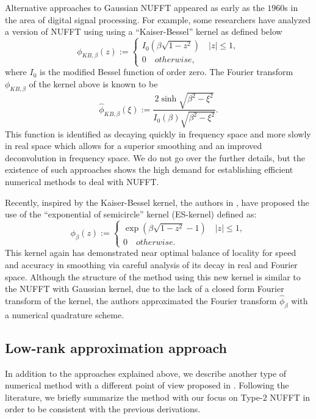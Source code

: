 Alternative approaches to Gaussian NUFFT appeared as early as the $1960$s in the area of digital signal processing.
For example, some researchers have analyzed a version of NUFFT using using a ``Kaiser-Bessel'' kernel \cite{Book-Kaiser} as defined below
\begin{equation}
  \phi_{KB,\beta}(z) :=
  \begin{cases}
    I_{0}\left(\beta\sqrt{1-z^2}\right) \quad |z| \le 1,\\
    0 \quad otherwise,
  \end{cases}
  \label{eq:KB-kernel}
\end{equation}
where $I_{0}$ is the modified Bessel function of order zero.
The Fourier transform $\phi_{KB,\beta}$ of the kernel above is known to be
\begin{equation}
  \hat{\phi}_{KB,\beta}(\xi) :=
  \frac{2\sinh\sqrt{\beta^2-\xi^2}}{I_{0}(\beta)\sqrt{\beta^2-\xi^2}}.
  \label{eq:FT-KB-kernel}
\end{equation}
This function is identified as decaying quickly in frequency space and more slowly in real space which allows for a superior smoothing and an improved deconvolution in frequency space.
We do not go over the further details, but the existence of such approaches shows the high demand for establishing efficient numerical methods to deal with NUFFT.

Recently, inspired by the Kaiser-Bessel kernel, the authors in \cite{SISC-2019-Barnett}, \cite{IEEE-2021-Barnett} have proposed the use of the ``exponential of semicircle'' kernel (ES-kernel) defined as:
\begin{equation}
  \phi_{\beta}(z) :=
  \begin{cases}
    \exp\left(\beta\sqrt{1-z^2} - 1\right) \quad |z| \le 1,\\
    0 \quad otherwise.
  \end{cases}
  \label{eq:ES-kernel}
\end{equation}
This kernel again has demonstrated near optimal balance of locality for speed and accuracy in smoothing via careful analysis of its decay in real and Fourier space.
Although the structure of the method using this new kernel is similar to the NUFFT with Gaussian kernel, due to the lack of a closed form Fourier transform of the kernel, the authors approximated the Fourier transform $\hat{\phi}_{\beta}$ with a numerical quadrature scheme.

\subsection{Low-rank approximation approach}
In addition to the approaches explained above, we describe another type of numerical method with a different point of view proposed in \cite{SISC-2018-Townsend}.
Following the literature, we briefly summarize the method with our focus on Type-$2$ NUFFT in order to be consistent with the previous derivations.

